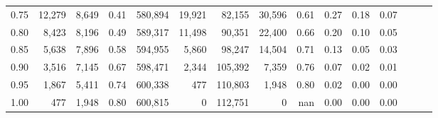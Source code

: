 \begin{tabular}{rrrrrrrrrrrrrrr}
0.75 &  12,279 &  8,649 &  0.41 &  580,894 &   19,921 &   82,155 &   30,596 &  0.61 &  0.27 &  0.18 &      0.07 \\
0.80 &   8,423 &  8,196 &  0.49 &  589,317 &   11,498 &   90,351 &   22,400 &  0.66 &  0.20 &  0.10 &      0.05 \\
0.85 &   5,638 &  7,896 &  0.58 &  594,955 &    5,860 &   98,247 &   14,504 &  0.71 &  0.13 &  0.05 &      0.03 \\
0.90 &   3,516 &  7,145 &  0.67 &  598,471 &    2,344 &  105,392 &    7,359 &  0.76 &  0.07 &  0.02 &      0.01 \\
0.95 &   1,867 &  5,411 &  0.74 &  600,338 &      477 &  110,803 &    1,948 &  0.80 &  0.02 &  0.00 &      0.00 \\
1.00 &     477 &  1,948 &  0.80 &  600,815 &        0 &  112,751 &        0 &   nan &  0.00 &  0.00 &      0.00 \\
\bottomrule
\end{tabular}
